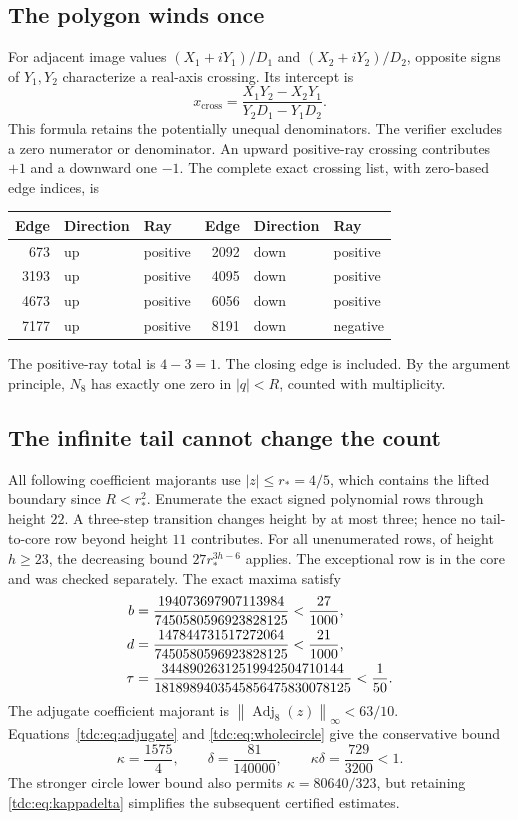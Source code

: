 \documentclass[11pt]{article}
\theoremstyle{definition}\newtheorem{definition}[theorem]{Definition}
\theoremstyle{remark}\newtheorem{remark}[theorem]{Remark}
\newcommand{\norm}[1]{\left\lVert#1\right\rVert}
\begin{document}
\subsection{The polygon winds once}
For adjacent image values $(X_1+iY_1)/D_1$ and $(X_2+iY_2)/D_2$, opposite signs of $Y_1,Y_2$ characterize a real-axis crossing. Its intercept is
\begin{equation}\label{tdc:eq:crossing}
 x_{\mathrm{cross}}=
 \frac{X_1Y_2-X_2Y_1}{Y_2D_1-Y_1D_2}.
\end{equation}
This formula retains the potentially unequal denominators. The verifier excludes a zero numerator or denominator. An upward positive-ray crossing contributes $+1$ and a downward one $-1$. The complete exact crossing list, with zero-based edge indices, is
\begin{center}
\begin{tabular}{rll@{\qquad}rll}
\toprule
Edge&Direction&Ray&Edge&Direction&Ray\\
\midrule
673&up&positive&2092&down&positive\\
3193&up&positive&4095&down&positive\\
4673&up&positive&6056&down&positive\\
7177&up&positive&8191&down&negative\\
\bottomrule
\end{tabular}
\end{center}
The positive-ray total is $4-3=1$. The closing edge is included. By the argument principle, $N_8$ has exactly one zero in $|q|<R$, counted with multiplicity.

\subsection{The infinite tail cannot change the count}
All following coefficient majorants use $|z|\le r_*=4/5$, which contains the lifted boundary since $R<r_*^2$. Enumerate the exact signed polynomial rows through height $22$. A three-step transition changes height by at most three; hence no tail-to-core row beyond height $11$ contributes. For all unenumerated rows, of height $h\ge23$, the decreasing bound $27r_*^{3h-6}$ applies. The exceptional row is in the core and was checked separately. The exact maxima satisfy
\begin{align}
 b&=\frac{194073697907113984}{7450580596923828125}<\frac{27}{1000},\notag\\
 d&=\frac{147844731517272064}{7450580596923828125}<\frac{21}{1000},\label{tdc:eq:tailnumerics}\\
 \tau&=\frac{34489026312519942504710144}{1818989403545856475830078125}
 <\frac1{50}.\notag
\end{align}
The adjugate coefficient majorant is $\norm{\operatorname{Adj}_8(z)}_\infty<63/10$. Equations~\eqref{tdc:eq:adjugate} and \eqref{tdc:eq:wholecircle} give the conservative bound
\begin{equation}\label{tdc:eq:kappadelta}
 \kappa=\frac{1575}{4},\qquad \delta=\frac{81}{140000},
 \qquad \kappa\delta=\frac{729}{3200}<1.
\end{equation}
The stronger circle lower bound also permits $\kappa=80640/323$, but retaining \eqref{tdc:eq:kappadelta} simplifies the subsequent certified estimates.
\end{document}
